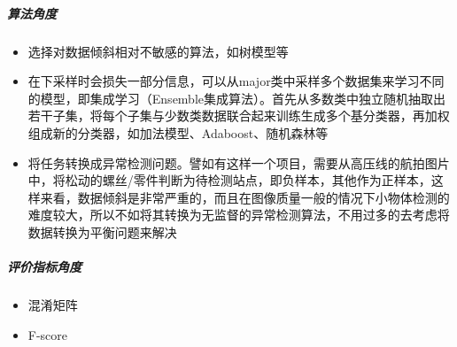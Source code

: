 \subparagraph{算法角度}
\begin{itemize}
	\item 选择对数据倾斜相对不敏感的算法，如树模型等
	\item 在下采样时会损失一部分信息，可以从major类中采样多个数据集来学习不同的模型，即集成学习（Ensemble集成算法）。首先从多数类中独立随机抽取出若干子集，将每个子集与少数类数据联合起来训练生成多个基分类器，再加权组成新的分类器，如加法模型、Adaboost、随机森林等
	\item 将任务转换成异常检测问题。譬如有这样一个项目，需要从高压线的航拍图片中，将松动的螺丝/零件判断为待检测站点，即负样本，其他作为正样本，这样来看，数据倾斜是非常严重的，而且在图像质量一般的情况下小物体检测的难度较大，所以不如将其转换为无监督的异常检测算法，不用过多的去考虑将数据转换为平衡问题来解决
\end{itemize}

\subparagraph{评价指标角度}
\begin{itemize}
	\item 混淆矩阵
	\item F-score
\end{itemize}


